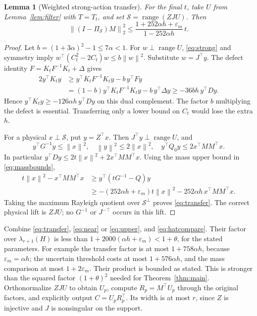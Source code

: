 \documentclass[11pt]{article}
\newtheorem{lemma}[theorem]{Lemma}
\newcommand{\norm}[1]{\left\lVert#1\right\rVert}
\newcommand{\range}{\operatorname{range}}
\begin{document}
\begin{lemma}[Weighted strong-action transfer]\label{lem:transfer}
For the final \(t\), take \(U\) from Lemma~\ref{lem:filter} with
\(T=T_t\), and set \(\mathcal S=\range(ZJU)\). Then
\begin{equation}\label{eq:transfer}
 \norm{(I-\Pi_{\mathcal S})M}_2^2
 \leq\frac{1+252\alpha h+\varepsilon_m}{1-252\alpha h}\,t.
\end{equation}
\end{lemma}
\begin{proof}
Let \(b=(1+3\alpha)^2-1\leq7\alpha<1\). For \(w\perp\range U\),
\eqref{eq:strong} and symmetry imply
\(w^\top(C_t^2-2C_t)w\leq b\norm w^2\). Substitute \(w=J^\top y\).
The defect identity \(F=K_tF^{-1}K_t+\Delta\) gives
\begin{align*}
 2y^\top K_ty
 &\geq y^\top K_tF^{-1}K_ty-b\,y^\top Fy\\
 &=(1-b)y^\top K_tF^{-1}K_ty-b\,y^\top\Delta y
 \geq-36bh\,y^\top Dy.
\end{align*}
Hence \(y^\top K_ty\geq-126\alpha h\,y^\top Dy\) on this dual
complement. The factor \(b\) multiplying the defect is essential.
Transferring only a lower bound on \(C_t\) would lose the extra \(h\).

For a physical \(x\perp\mathcal S\), put \(y=Z^\top x\). Then
\(J^\top y\perp\range U\), and
\[
 y^\top G^{-1}y\leq\norm x^2,\quad
 \norm y^2\leq2\norm x^2,\quad
 y^\top Q_0y\leq2x^\top MM^\top x.
\]
In particular \(y^\top Dy\leq2t\norm x^2+2x^\top MM^\top x\).
Using the mass upper bound in \eqref{eq:massbounds},
\begin{align*}
 t\norm x^2-x^\top MM^\top x
 &\geq y^\top(tG^{-1}-Q)y\\
 &\geq-(252\alpha h+\varepsilon_m)t\norm x^2
           -252\alpha h\,x^\top MM^\top x.
\end{align*}
Taking the maximum Rayleigh quotient over \(\mathcal S^\perp\)
proves \eqref{eq:transfer}. The correct physical lift is \(ZJU\);
no \(G^{-1}\) or \(J^{-\top}\) occurs in this lift.
\end{proof}

Combine \eqref{eq:transfer}, \eqref{eq:near} or \eqref{eq:upper},
and \eqref{eq:hatcompare}. Their factor over \(\lambda_{r+1}(H)\)
is less than \(1+2000(\alpha h+\varepsilon_m)<1+\theta\), for the
stated parameters. For example the transfer factor is at most
\(1+758\alpha h\), because \(\varepsilon_m=\alpha h\); the uncertain
threshold costs at most \(1+576\alpha h\), and the mass comparison
at most \(1+2\varepsilon_m\). Their product is bounded as stated.
This is stronger than the squared factor \((1+\theta)^2\) needed
for Theorem~\ref{thm:main}.
Orthonormalize \(ZJU\) to obtain \(U_p\), compute \(R_p=M^\top U_p\)
through the original factors, and explicitly output \(C=U_pR_p^\top\).
Its width is at most \(r\), since \(Z\) is injective and \(J\) is
nonsingular on the support.
\end{document}
